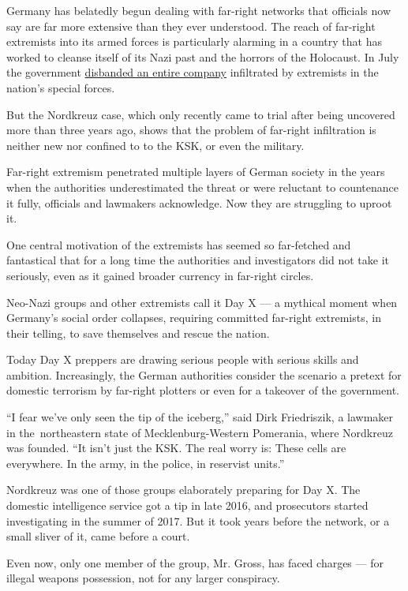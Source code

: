 Germany has belatedly begun dealing with far-right networks that
officials now say are far more extensive than they ever understood. The
reach of far-right extremists into its armed forces is particularly
alarming in a country that has worked to cleanse itself of its Nazi past
and the horrors of the Holocaust. In July the government
\href{https://www.nytimes3xbfgragh.onion/2020/07/01/world/europe/german-special-forces-far-right.html}{disbanded
an entire company} infiltrated by extremists in the nation's special
forces.

But the Nordkreuz case, which only recently came to trial after being
uncovered more than three years ago, shows that the problem of far-right
infiltration is neither new nor confined to to the KSK, or even the
military.

Far-right extremism penetrated multiple layers of German society in the
years when the authorities underestimated the threat or were reluctant
to countenance it fully, officials and lawmakers acknowledge. Now they
are struggling to uproot it.

One central motivation of the extremists has seemed so far-fetched and
fantastical that for a long time the authorities and investigators did
not take it seriously, even as it gained broader currency in far-right
circles.

Neo-Nazi groups and other extremists call it Day X --- a mythical moment
when Germany's social order collapses, requiring committed far-right
extremists, in their telling, to save themselves and rescue the nation.

Today Day X preppers are drawing serious people with serious skills and
ambition. Increasingly, the German authorities consider the scenario a
pretext for domestic terrorism by far-right plotters or even for a
takeover of the government.

``I fear we've only seen the tip of the iceberg,'' said Dirk
Friedriszik, a lawmaker in the~northeastern state of Mecklenburg-Western
Pomerania, where Nordkreuz was founded. ``It isn't just the KSK. The
real worry is: These cells are everywhere. In the army, in the police,
in reservist units.''

Nordkreuz was one of those groups elaborately preparing for Day X. The
domestic intelligence service got a tip in late 2016, and prosecutors
started investigating in the summer of 2017. But it took years before
the network, or a small sliver of it, came before a court.

Even now, only one member of the group, Mr. Gross, has faced charges ---
for illegal weapons possession, not for any larger conspiracy.

